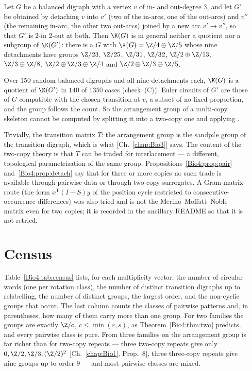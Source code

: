 \begin{proposition}\label{Bio4:prop:detach}
Let $G$ be a balanced digraph with a vertex $v$ of in- and out-degree $3$, and let $G'$
be obtained by detaching $v$ into $v'$ (two of the in-arcs, one of the out-arcs) and
$v''$ (the remaining in-arc, the other two out-arcs) joined by a new arc $v'\to v''$, so
that $G'$ is $2$-in $2$-out at both. Then $\K(G)$ is in general neither a quotient nor a
subgroup of $\K(G')$: there is a $G$ with $\K(G)=\Z/4\oplus\Z/5$ whose nine detachments
have groups $\Z/23$, $\Z/25$, $\Z/31$, $\Z/32$, $\Z/2\oplus\Z/13$, $\Z/3\oplus\Z/8$,
$\Z/2\oplus\Z/3\oplus\Z/4$ and $\Z/2\oplus\Z/3\oplus\Z/5$.
\end{proposition}

Over $150$ random balanced digraphs and all nine detachments each, $\K(G)$ is a quotient
of $\K(G')$ in $140$ of $1350$ cases (check~(C)). Euler circuits of $G'$ are those of $G$
compatible with the chosen transition at $v$, a subset of no fixed proportion, and the
group follows the count. So the arrangement group of a multi-copy skeleton cannot be
computed by splitting it into a two-copy one and applying \cite{MMN}.

\begin{remark}
Trivially, the transition matrix $T$: the arrangement group is the sandpile group of the
transition digraph, which is what [Ch.~\ref{chap:Bio3}] says. The content of the two-copy theory is
that $T$ can be traded for interlacement --- a different, topological parametrisation of
the same group. Propositions~\ref{Bio4:prop:pair} and~\ref{Bio4:prop:detach} say that for three or
more copies no such trade is available through pairwise data or through two-copy
surrogates. A Gram-matrix route (the form $x^{\mathsf T}(I-S)y$ of the position cycle
restricted to consecutive-occurrence differences) was also tried and is not the
Merino--Moffatt--Noble matrix even for two copies; it is recorded in the ancillary
README so that it is not retried.
\end{remark}

\section{Census}\label{Bio4:sec:census}

Table~\ref{Bio4:tab:census} lists, for each multiplicity vector, the number of circular words
(one per rotation class), the number of distinct transition digraphs up to relabelling,
the number of distinct groups, the largest order, and the non-cyclic groups that occur.
The last column counts the classes of pairwise patterns and, in parentheses, how many of
them carry more than one group. For two families the groups are exactly $\Z/c$,
$c\le\min(r,s)$, as Theorem~\ref{Bio4:thm:two} predicts, and every pairwise class is pure.
From three families on the arrangement group is far richer than for two-copy repeats
--- three two-copy repeats give only $0,\Z/2,\Z/3,(\Z/2)^{2}$ [Ch.~\ref{chap:Bio1}, Prop.~8],
three three-copy repeats give nine groups up to order $9$ --- and most pairwise classes
are mixed.

